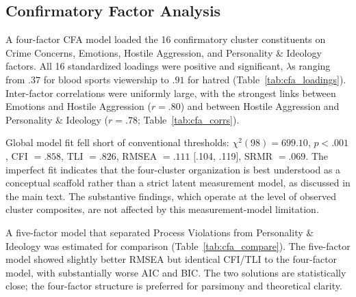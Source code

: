 \subsection{Confirmatory Factor Analysis}
\label{sec:supp_cfa}

A four-factor CFA model loaded the 16 confirmatory cluster constituents on Crime Concerns, Emotions, Hostile Aggression, and Personality \& Ideology factors. All 16 standardized loadings were positive and significant, $\lambda$s ranging from $.37$ for blood sports viewership to $.91$ for hatred (Table~\ref{tab:cfa_loadings}). Inter-factor correlations were uniformly large, with the strongest links between Emotions and Hostile Aggression ($r = .80$) and between Hostile Aggression and Personality \& Ideology ($r = .78$; Table~\ref{tab:cfa_corrs}).

Global model fit fell short of conventional thresholds: $\chi^2(98) = 699.10$, $p < .001$, CFI $= .858$, TLI $= .826$, RMSEA $= .111$ [.104, .119], SRMR $= .069$. The imperfect fit indicates that the four-cluster organization is best understood as a conceptual scaffold rather than a strict latent measurement model, as discussed in the main text. The substantive findings, which operate at the level of observed cluster composites, are not affected by this measurement-model limitation.

A five-factor model that separated Process Violations from Personality \& Ideology was estimated for comparison (Table~\ref{tab:cfa_compare}). The five-factor model showed slightly better RMSEA but identical CFI/TLI to the four-factor model, with substantially worse AIC and BIC. The two solutions are statistically close; the four-factor structure is preferred for parsimony and theoretical clarity.

